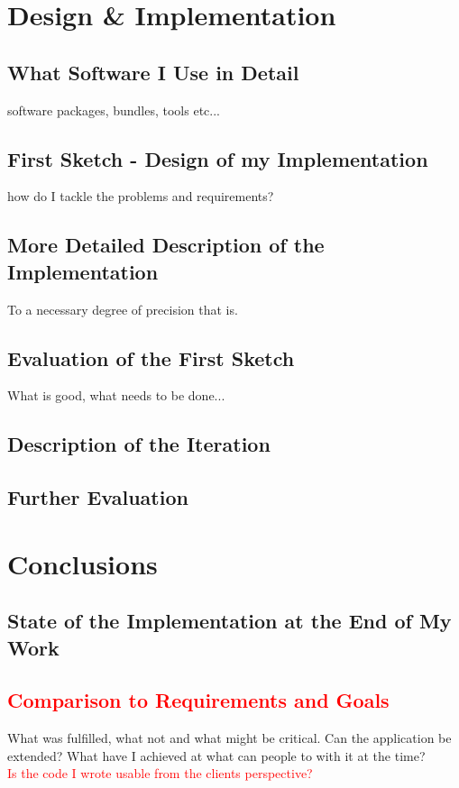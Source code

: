 \documentclass[12p]{scrartcl}
\begin{document}
\section{Design \& Implementation}
\label{sec:implementation}
\subsection{What Software I Use in Detail}
software packages, bundles, tools etc...
\subsection{First Sketch - Design of my Implementation}
how do I tackle the problems and requirements?
\subsection{More Detailed Description of the Implementation}
To a necessary degree of precision that is.
\subsection{Evaluation of the First Sketch}
What is good, what needs to be done...
\subsection{Description of the Iteration}
\subsection{Further Evaluation}




\section{Conclusions}
\label{sec:conclusions}
\subsection{State of the Implementation at the End of My Work}
\subsection{\textcolor{red}{Comparison to Requirements and Goals}}
What was fulfilled, what not and what might be critical. Can the application be extended? What have I achieved at what can people to with it at the time?\\
\textcolor{red}{Is the code I wrote usable from the clients perspective?}
\end{document}
